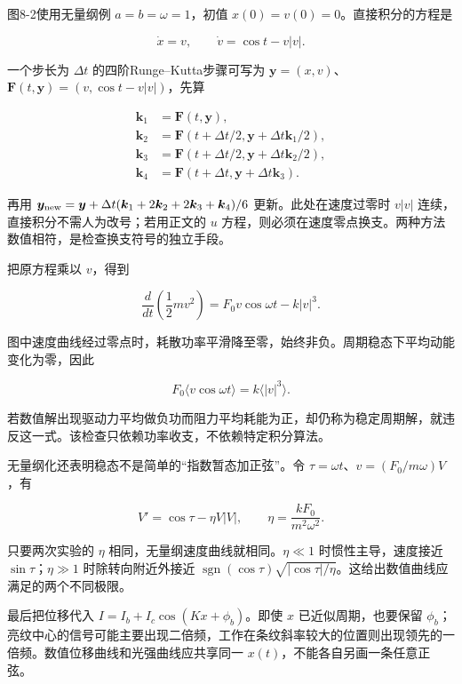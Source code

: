 \documentclass[12pt,a4paper,UTF8]{ctexart}
\begin{document}
图8-2使用无量纲例 \(a=b=\omega=1\)，初值
\(x(0)=v(0)=0\)。直接积分的方程是

\[
\dot x=v,\qquad \dot v=\cos t-v|v|.
\]

一个步长为 \(\Delta t\) 的四阶Runge--Kutta步骤可写为
\(\boldsymbol y=(x,v)\)、\(\boldsymbol F(t,\boldsymbol y)=(v,\cos t-v|v|)\)，先算

\[
\begin{aligned}
\boldsymbol k_1&=\boldsymbol F(t,\boldsymbol y),\\
\boldsymbol k_2&=\boldsymbol F(t+\Delta t/2,\boldsymbol y+\Delta t\boldsymbol k_1/2),\\
\boldsymbol k_3&=\boldsymbol F(t+\Delta t/2,\boldsymbol y+\Delta t\boldsymbol k_2/2),\\
\boldsymbol k_4&=\boldsymbol F(t+\Delta t,\boldsymbol y+\Delta t\boldsymbol k_3).
\end{aligned}
\]

再用
\(\boldsymbol y_{\rm new}=\boldsymbol y+\Delta t(\boldsymbol k_1+2\boldsymbol k_2+2\boldsymbol k_3+\boldsymbol k_4)/6\)
更新。此处在速度过零时 \(v|v|\) 连续，直接积分不需人为改号；若用正文的
\(u\)
方程，则必须在速度零点换支。两种方法数值相符，是检查换支符号的独立手段。

把原方程乘以 \(v\)，得到

\[
\frac{d}{dt}\left(\frac12mv^2\right)
=F_0v\cos\omega t-k|v|^3.
\]

图中速度曲线经过零点时，耗散功率平滑降至零，始终非负。周期稳态下平均动能变化为零，因此

\[
F_0\langle v\cos\omega t\rangle=k\langle|v|^3\rangle.
\]

若数值解出现驱动力平均做负功而阻力平均耗能为正，却仍称为稳定周期解，就违反这一式。该检查只依赖功率收支，不依赖特定积分算法。

无量纲化还表明稳态不是简单的``指数暂态加正弦''。令
\(\tau=\omega t\)、\(v=(F_0/m\omega)V\)，有

\[
V'=\cos\tau-\eta V|V|,\qquad
\eta=\frac{kF_0}{m^2\omega^2}.
\]

只要两次实验的 \(\eta\) 相同，无量纲速度曲线就相同。\(\eta\ll1\)
时惯性主导，速度接近 \(\sin\tau\)；\(\eta\gg1\) 时除转向附近外接近
\(\operatorname{sgn}(\cos\tau)\sqrt{|\cos\tau|/\eta}\)。这给出数值曲线应满足的两个不同极限。

最后把位移代入 \(I=I_b+I_c\cos(Kx+\phi_b)\)。即使 \(x\)
已近似周期，也要保留
\(\phi_b\)；亮纹中心的信号可能主要出现二倍频，工作在条纹斜率较大的位置则出现领先的一倍频。数值位移曲线和光强曲线应共享同一
\(x(t)\)，不能各自另画一条任意正弦。
\end{document}
